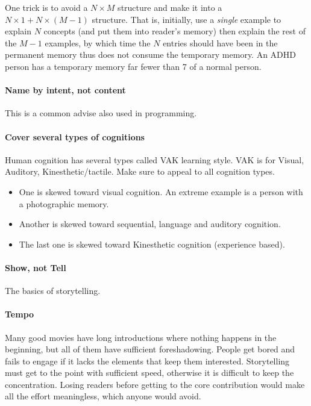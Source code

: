 One trick is to avoid a $N\times M$ structure and make it into a $N \times 1 + N \times (M-1)$ structure.
That is, initially, use a \emph{single} example to explain $N$ concepts (and put them into reader's memory)
then explain the rest of the $M-1$ examples, by which time the $N$ entries should have been in the permanent memory
thus does not consume the temporary memory.
An ADHD person has a temporary memory far fewer than 7 of a normal person.


\paragraph{Name by intent, not content}

This is a common advise also used in programming.

\paragraph{Cover several types of cognitions}

Human cognition has several types called VAK learning style.
VAK is for Visual, Auditory, Kinesthetic/tactile.
Make sure to appeal to all cognition types.

\begin{itemize}
 \item One is skewed toward visual cognition. An extreme example is a person with a photographic memory.
 \item Another is skewed toward sequential, language and auditory cognition.
 \item The last one is skewed toward Kinesthetic cognition (experience based).
\end{itemize}

\paragraph{Show, not Tell}

The basics of storytelling.

\paragraph{Tempo}

Many good movies have long introductions where nothing happens in the beginning, but all of them have sufficient foreshadowing.
People get bored and fails to engage if it lacks the elements that keep them interested.
Storytelling must get to the point with sufficient speed, otherwise it is difficult to keep the concentration.
Losing readers before getting to the core contribution would make all the effort meaningless, which anyone would avoid.

